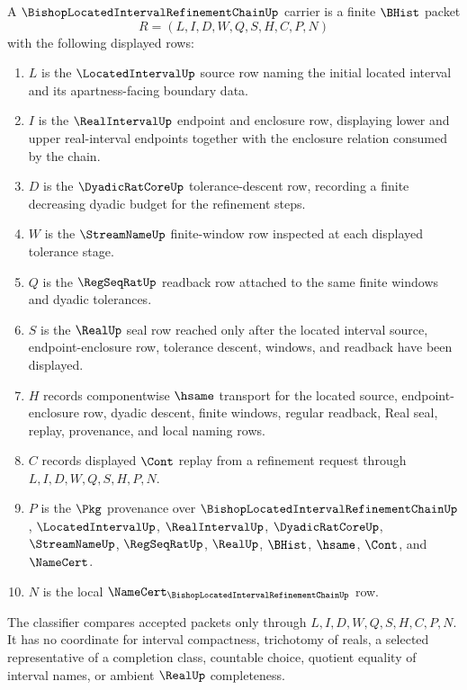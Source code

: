 \begin{definition}
\label{def:bishop-located-interval-refinement-chain-carrier}
A $\BishopLocatedIntervalRefinementChainUp$ carrier is a finite $\BHist$ packet
$$
R=(L,I,D,W,Q,S,H,C,P,N)
$$
with the following displayed rows:
\begin{enumerate}
\item $L$ is the $\LocatedIntervalUp$ source row naming the initial located interval and its apartness-facing boundary data.
\item $I$ is the $\RealIntervalUp$ endpoint and enclosure row, displaying lower and upper real-interval endpoints together with the enclosure relation consumed by the chain.
\item $D$ is the $\DyadicRatCoreUp$ tolerance-descent row, recording a finite decreasing dyadic budget for the refinement steps.
\item $W$ is the $\StreamNameUp$ finite-window row inspected at each displayed tolerance stage.
\item $Q$ is the $\RegSeqRatUp$ readback row attached to the same finite windows and dyadic tolerances.
\item $S$ is the $\RealUp$ seal row reached only after the located interval source, endpoint-enclosure row, tolerance descent, windows, and readback have been displayed.
\item $H$ records componentwise $\hsame$ transport for the located source, endpoint-enclosure row, dyadic descent, finite windows, regular readback, Real seal, replay, provenance, and local naming rows.
\item $C$ records displayed $\Cont$ replay from a refinement request through $L,I,D,W,Q,S,H,P,N$.
\item $P$ is the $\Pkg$ provenance over $\BishopLocatedIntervalRefinementChainUp$, $\LocatedIntervalUp$, $\RealIntervalUp$, $\DyadicRatCoreUp$, $\StreamNameUp$, $\RegSeqRatUp$, $\RealUp$, $\BHist$, $\hsame$, $\Cont$, and $\NameCert$.
\item $N$ is the local $\NameCert_{\BishopLocatedIntervalRefinementChainUp}$ row.
\end{enumerate}
The classifier compares accepted packets only through $L,I,D,W,Q,S,H,C,P,N$. It has no coordinate for interval compactness, trichotomy of reals, a selected representative of a completion class, countable choice, quotient equality of interval names, or ambient $\RealUp$ completeness.
\end{definition}

